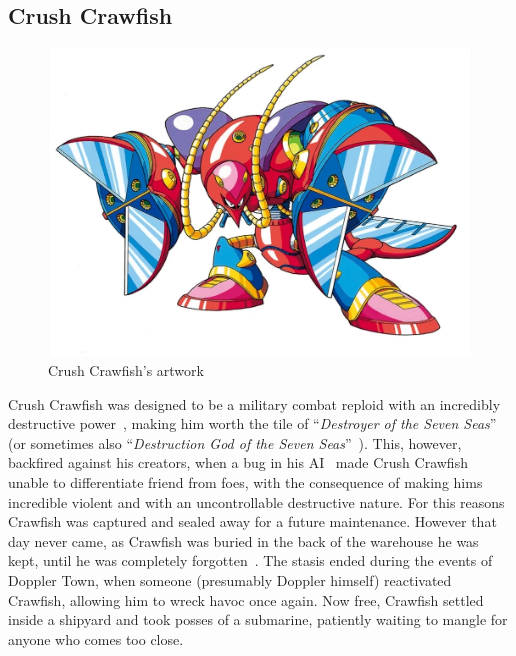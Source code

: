 \subsection{Crush Crawfish}\label{boss:Crush_crawfish}
\begin{figure}[htp]
	\centering
	\includegraphics[height=\portraitsize]{figures/X3/Crush_crawfish/crushcrawfish.png}
	\caption{Crush Crawfish's artwork~\cite{book:MMX_Complete_art}}
\end{figure}
Crush Crawfish was designed to be a military combat reploid with an incredibly destructive power~\cite{wayback:X3_resources}, making him worth the tile of ``\textit{Destroyer of the Seven Seas}''~\cite{wiki:Crush_crawfish} (or sometimes also ``\textit{Destruction God of the Seven Seas}''~\cite{wayback:X3_resources}). This, however, backfired against his creators, when a bug in his AI~\cite{wiki:Crush_crawfish} made Crush Crawfish unable to differentiate friend from foes, with the consequence of making hims incredible violent and with an uncontrollable destructive nature. For this reasons Crawfish was captured and sealed away for a future maintenance. However that day never came, as Crawfish was buried in the back of the warehouse he was kept, until he was completely forgotten~\cite{Xcoll1:Manual_X3}. The stasis ended during the events of Doppler Town, when someone (presumably Doppler himself) reactivated Crawfish, allowing him to wreck havoc once again. Now free, Crawfish settled inside a shipyard and took posses of a submarine, patiently waiting to mangle for anyone who comes too close.

